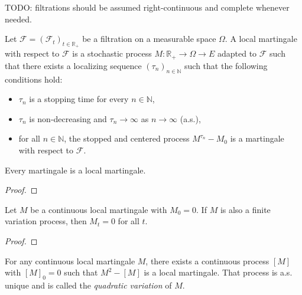 TODO: filtrations should be assumed right-continuous and complete whenever needed.

\begin{definition}\label{def:IsLocalMartingale}
Let $\mathcal{F} = (\mathcal{F}_t)_{t \in \mathbb{R}_+}$ be a filtration on a measurable space $\Omega$.
A local martingale with respect to $\mathcal{F}$ is a stochastic process $M : \mathbb{R}_+ \to \Omega \to E$ adapted to $\mathcal{F}$ such that there exists a localizing sequence $(\tau_n)_{n \in \mathbb{N}}$ such that the following conditions hold:
\begin{itemize}
  \item $\tau_n$ is a stopping time for every $n \in \mathbb{N}$,
  \item $\tau_n$ is non-decreasing and $\tau_n \to \infty$ as $n \to \infty$ (a.s.),
  \item for all $n \in \mathbb{N}$, the stopped and centered process $M^{\tau_n} - M_0$ is a martingale with respect to $\mathcal{F}$.
\end{itemize}
\end{definition}


\begin{lemma}\label{lem:Martingale.IsLocalMartingale}
Every martingale is a local martingale.
\end{lemma}

\begin{proof}

\end{proof}


\begin{theorem}\label{thm:IsLocalMartingale.eq_zero_of_finiteVariation}
Let $M$ be a continuous local martingale with $M_0 = 0$. If $M$ is also a finite variation process, then $M_t = 0$ for all $t$.
\end{theorem}

\begin{proof}

\end{proof}


\begin{definition}\label{def:quadraticVariation}
For any continuous local martingale $M$, there exists a continuous process $[M]$ with $[M]_0 = 0$ such that $M^2 - [M]$ is a local martingale. That process is a.s. unique and is called the \emph{quadratic variation} of $M$.
\end{definition}


